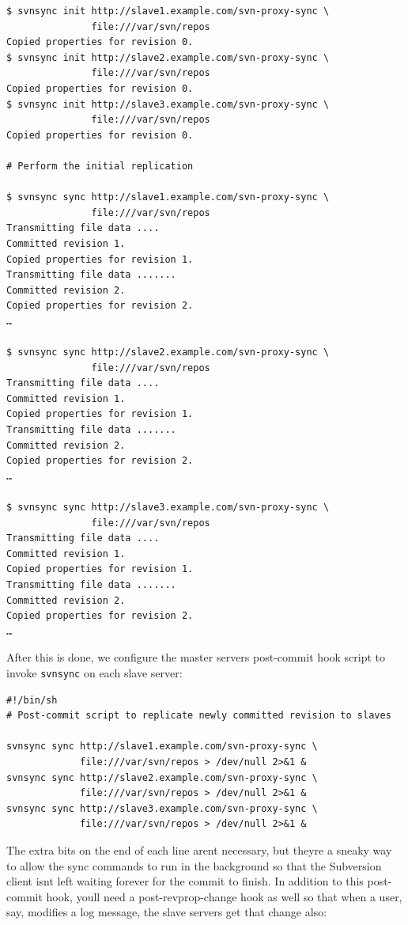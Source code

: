 \begin{verbatim}
$ svnsync init http://slave1.example.com/svn-proxy-sync \
               file:///var/svn/repos
Copied properties for revision 0.
$ svnsync init http://slave2.example.com/svn-proxy-sync \
               file:///var/svn/repos
Copied properties for revision 0.
$ svnsync init http://slave3.example.com/svn-proxy-sync \
               file:///var/svn/repos
Copied properties for revision 0.

# Perform the initial replication

$ svnsync sync http://slave1.example.com/svn-proxy-sync \
               file:///var/svn/repos
Transmitting file data ....
Committed revision 1.
Copied properties for revision 1.
Transmitting file data .......
Committed revision 2.
Copied properties for revision 2.
…

$ svnsync sync http://slave2.example.com/svn-proxy-sync \
               file:///var/svn/repos
Transmitting file data ....
Committed revision 1.
Copied properties for revision 1.
Transmitting file data .......
Committed revision 2.
Copied properties for revision 2.
…

$ svnsync sync http://slave3.example.com/svn-proxy-sync \
               file:///var/svn/repos
Transmitting file data ....
Committed revision 1.
Copied properties for revision 1.
Transmitting file data .......
Committed revision 2.
Copied properties for revision 2.
…
\end{verbatim}

After this is done, we configure the master server\textquotesingle s
post-commit hook script to invoke \texttt{svnsync} on each slave server:

\begin{verbatim}
#!/bin/sh
# Post-commit script to replicate newly committed revision to slaves

svnsync sync http://slave1.example.com/svn-proxy-sync \
             file:///var/svn/repos > /dev/null 2>&1 &
svnsync sync http://slave2.example.com/svn-proxy-sync \
             file:///var/svn/repos > /dev/null 2>&1 &
svnsync sync http://slave3.example.com/svn-proxy-sync \
             file:///var/svn/repos > /dev/null 2>&1 &
\end{verbatim}

The extra bits on the end of each line aren\textquotesingle t necessary,
but they\textquotesingle re a sneaky way to allow the sync commands to
run in the background so that the Subversion client
isn\textquotesingle t left waiting forever for the commit to finish. In
addition to this post-commit hook, you\textquotesingle ll need a
post-revprop-change hook as well so that when a user, say, modifies a
log message, the slave servers get that change also:

